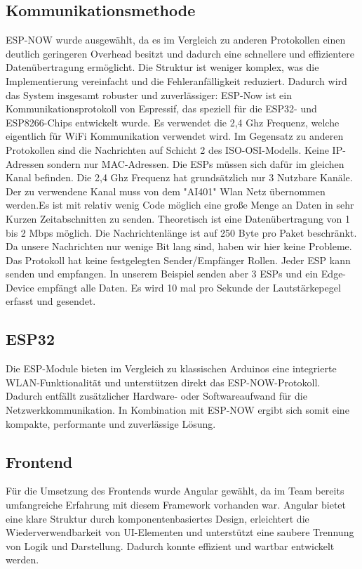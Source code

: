 \subsection{Kommunikationsmethode}
ESP-NOW wurde ausgewählt, da es im Vergleich zu anderen Protokollen einen deutlich geringeren Overhead besitzt und dadurch eine schnellere und effizientere Datenübertragung ermöglicht. Die Struktur ist weniger komplex, was die Implementierung vereinfacht und die Fehleranfälligkeit reduziert. 
Dadurch wird das System insgesamt robuster und zuverlässiger:
ESP-Now ist ein Kommunikationsprotokoll von Espressif, das speziell für die ESP32- und ESP8266-Chips entwickelt wurde. Es verwendet die 2,4 Ghz Frequenz, welche eigentlich für WiFi Kommunikation verwendet wird. 
Im Gegensatz zu anderen Protokollen sind die Nachrichten auf Schicht 2 des ISO-OSI-Modells. Keine IP-Adressen sondern nur MAC-Adressen. Die ESPs müssen sich dafür im gleichen Kanal befinden. Die 2,4 Ghz Frequenz hat grundsätzlich nur 3 Nutzbare Kanäle. 
Der zu verwendene Kanal muss von dem "AI401" Wlan Netz übernommen werden.Es ist mit relativ wenig Code möglich eine große Menge an Daten in sehr Kurzen Zeitabschnitten zu senden. Theoretisch ist eine Datenübertragung von 1 bis 2 Mbps möglich. 
Die Nachrichtenlänge ist auf 250 Byte pro Paket beschränkt. Da unsere Nachrichten nur wenige Bit lang sind, haben wir hier keine Probleme. 
Das Protokoll hat keine festgelegten Sender/Empfänger Rollen. Jeder ESP kann senden und empfangen. In unserem Beispiel senden aber 3 ESPs und ein Edge-Device empfängt alle Daten. 
Es wird 10 mal pro Sekunde der Lautstärkepegel erfasst und gesendet.

\subsection{ESP32}
Die ESP-Module bieten im Vergleich zu klassischen Arduinos eine integrierte WLAN-Funktionalität und unterstützen direkt das ESP-NOW-Protokoll. Dadurch entfällt zusätzlicher Hardware- oder Softwareaufwand für die Netzwerkkommunikation.
In Kombination mit ESP-NOW ergibt sich somit eine kompakte, performante und zuverlässige Lösung.

\subsection{Frontend}
Für die Umsetzung des Frontends wurde Angular gewählt, 
da im Team bereits umfangreiche Erfahrung mit diesem Framework vorhanden war. 
Angular bietet eine klare Struktur durch komponentenbasiertes Design, 
erleichtert die Wiederverwendbarkeit von UI-Elementen und unterstützt eine saubere Trennung von Logik und Darstellung. 
Dadurch konnte effizient und wartbar entwickelt werden.

